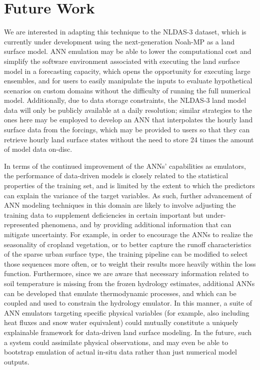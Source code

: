 \section{Future Work}

We are interested in adapting this technique to the NLDAS-3 dataset, which is currently under development using the next-generation Noah-MP as a land surface model. ANN emulation may be able to lower the computational cost and simplify the software environment associated with executing the land surface model in a forecasting capacity, which opens the opportunity for executing large ensembles, and for users to easily manipulate the inputs to evaluate hypothetical scenarios on custom domains without the difficulty of running the full numerical model. Additionally, due to data storage constraints, the NLDAS-3 land model data will only be publicly available at a daily resolution; similar strategies to the ones here may be employed to develop an ANN that interpolates the hourly land surface data from the forcings, which may be provided to users so that they can retrieve hourly land surface states without the need to store 24 times the amount of model data on-disc.

In terms of the continued improvement of the ANNs' capabilities as emulators, the performance of data-driven models is closely related to the statistical properties of the training set, and is limited by the extent to which the predictors can explain the variance of the target variables. As such, further advancement of ANN modeling techniques in this domain are likely to involve adjusting the training data to supplement deficiencies in certain important but under-represented phenomena, and by providing additional information that can mitigate uncertainty. For example, in order to encourage the ANNs to realize the seasonality of cropland vegetation, or to better capture the runoff characteristics of the sparse urban surface type, the training pipeline can be modified to select those sequences more often, or to weight their results more heavily within the loss function. Furthermore, since we are aware that necessary information related to soil temperature is missing from the frozen hydrology estimates, additional ANNs can be developed that emulate thermodynamic processes, and which can be coupled and used to constrain the hydrology emulator. In this manner, a suite of ANN emulators targeting specific physical variables (for example, also including heat fluxes and snow water equivalent) could mutually constitute a uniquely explainable framework for data-driven land surface modeling. In the future, such a system could assimilate physical observations, and may even be able to bootstrap emulation of actual in-situ data rather than just numerical model outputs.

